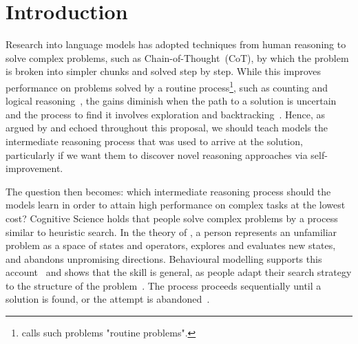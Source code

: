 \chapter{Introduction}
\label{ch:introduction}

Research into language models has adopted techniques from human reasoning to solve complex problems, such as Chain-of-Thought~(CoT), by which the problem is broken into simpler chunks and solved step by step.
While this improves performance on problems solved by a routine process\footnote{\citet{polya1945solve} calls such problems "routine problems".}, such as counting and logical reasoning~\citep{nyeShowYourWork2021,weiChainofThoughtPromptingElicits2023,kojimaLargeLanguageModels2022}, the gains diminish when the path to a solution is uncertain and the process to find it involves exploration and backtracking~\citep{gandhiStreamSearchSoS2024,yaoTreeThoughtsDeliberate2023,selAlgorithmThoughtsEnhancing2024,dziriFaithFateLimits2023,stechlyChainThoughtlessnessAnalysis2024}.
Hence, as argued by \citet{xiangSystem2Reasoning2025} and echoed throughout this proposal, we should teach models the intermediate reasoning process that was used to arrive at the solution, particularly if we want them to discover novel reasoning approaches via self-improvement.

The question then becomes: which intermediate reasoning process should the models learn in order to attain high performance on complex tasks at the lowest cost?
Cognitive Science holds that people solve complex problems by a process similar to heuristic search.
In the theory of \citet{newell1972human}, a person represents an unfamiliar problem as a space of states and operators, explores and evaluates new states, and abandons unpromising directions.
Behavioural modelling supports this account~\citep{vanopheusdenExpertiseIncreasesPlanning2023} and shows that the skill is general, as people adapt their search strategy to the structure of the problem~\citep{callawayRationalUseCognitive2022}.
The process proceeds sequentially until a solution is found, or the attempt is abandoned~\citep{CognitiveSearchEvolution2012,fuInterfacingMindEnvironment2015a}.

